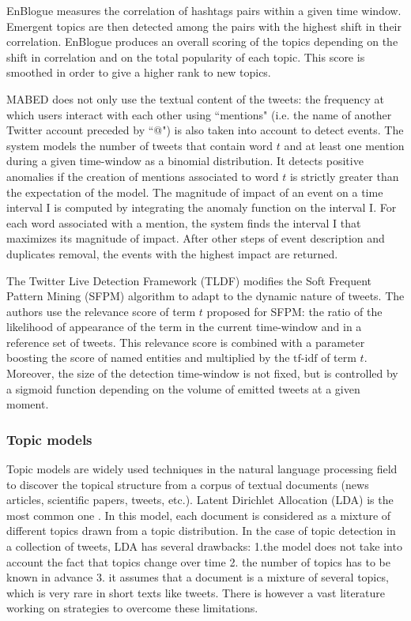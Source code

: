 		EnBlogue \citep{alvanaki_see_2012} measures the correlation of hashtags pairs within a given time window. Emergent topics are then detected among the pairs with the highest shift in their correlation. EnBlogue produces an overall scoring of the topics depending on the shift in correlation and on the total popularity of each topic. This score is smoothed in order to give a higher rank to new topics. 
		
		MABED \citep{guille_event_2015} does not only use the textual content of the tweets: the frequency at which users interact with each other using ``mentions" (i.e. the name of another Twitter account preceded by ``@") is also taken into account to detect events. The system models the number of tweets that contain word $t$ and at least one mention during a given time-window as a binomial distribution. It detects positive anomalies if the creation of mentions associated to word $t$ is strictly greater than the expectation of the model. The magnitude of impact of an event on a time interval I is computed by integrating the anomaly function on the interval I. For each word associated with a mention, the system finds the interval I that maximizes its magnitude of impact. After other steps of event description and duplicates removal, the events with the highest impact are returned.
		
		The Twitter Live Detection Framework (TLDF) \citep{gaglio_framework_2016} modifies the Soft Frequent Pattern Mining (SFPM) algorithm \citep{petkos_soft_2014} to adapt to the dynamic nature of tweets. The authors use the relevance score of term $t$ proposed for SFPM: the ratio of the likelihood of appearance of the term in the current time-window and in a reference set of tweets. This relevance score is combined with a parameter boosting the score of named entities and multiplied by the $\mbox{tf-idf}$ of term $t$. Moreover, the size of the detection time-window is not fixed, but is controlled by a sigmoid function depending on the volume of emitted tweets at a given moment.
	
	\subsubsection{Topic models} 
	\label{topic models}
	Topic models are widely used techniques in the natural language processing field to discover the topical structure from a corpus of textual documents (news articles, scientific papers, tweets, etc.). Latent Dirichlet Allocation (LDA) is the most common one \citep{blei_latent_2003}. In this model, each document is considered as a mixture of different topics drawn from a topic distribution. In the case of topic detection in a collection of tweets, LDA has several drawbacks: 1.the model does not take into account the fact that topics change over time 2. the number of topics has to be known in advance 3. it assumes that a document is a mixture of several topics, which is very rare in short texts like tweets. There is however a vast literature working on strategies to overcome these limitations.
	
